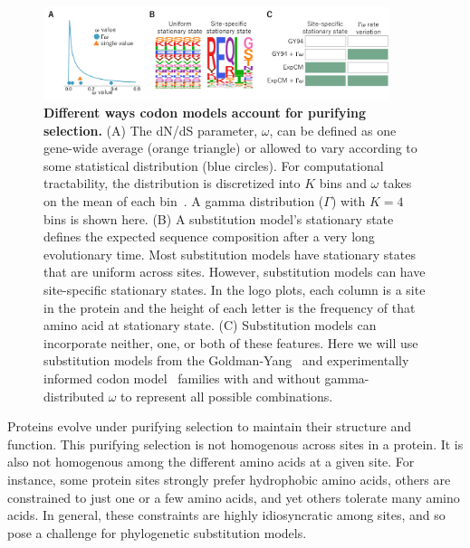 \documentclass[11pt]{article}
\begin{document}
\begin{figure}
\centerline{\includegraphics[width=0.90\textwidth]{figures/model_feature.pdf}}
\caption{\label{fig:model_feature}
\textbf{Different ways codon models account for purifying selection.}
(A) The dN/dS parameter, $\omega$, can be defined as one gene-wide average (orange triangle) or allowed to vary according to some statistical distribution (blue circles). 
For computational tractability, the distribution is discretized into $K$ bins and $\omega$ takes on the mean of each bin~\citep{yang1994maximum,yang2000codon}. 
A gamma distribution ($\Gamma$) with $K=4$ bins is shown here.
(B) A substitution model's stationary state defines the expected sequence composition after a very long evolutionary time. 
Most substitution models have stationary states that are uniform across sites.
However, substitution models can have site-specific stationary states.
In the logo plots, each column is a site in the protein and the height of each letter is the frequency of that amino acid at stationary state. 
(C) Substitution models can incorporate neither, one, or both of these features.
Here we will use substitution models from the Goldman-Yang~\citep[GY94;][]{goldman1994codon,yang2000codon} and experimentally informed codon model~\citep[ExpCM;][]{hilton2017phydms} families with and without gamma-distributed $\omega$ to represent all possible combinations.
}
\end{figure}

Proteins evolve under purifying selection to maintain their structure and function. 
This purifying selection is not homogenous across sites in a protein.
It is also not homogenous among the different amino acids at a given site.
For instance, some protein sites strongly prefer hydrophobic amino acids, others are constrained to just one or a few amino acids, and yet others tolerate many amino acids.
In general, these constraints are highly idiosyncratic among sites, and so pose a challenge for phylogenetic substitution models.
\end{document}

